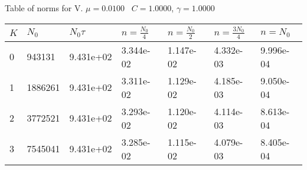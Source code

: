 \begin{center}
Table of norms for V. $\mu = 0.0100$ \, $C = 1.0000$, $\gamma = 1.0000$
  
\begin{tabular}{|p{0.8in}|p{0.8in}|p{0.8in}|p{0.8in}|p{0.8in}|p{0.8in}|p{0.8in}|} \hline
$K$ &$N_0$ &$N_0 \tau$ &$n = \frac{N_0}{4}$ &$n = \frac{N_0}{2}$ &$n = \frac{3N_0}{4}$ &$n = N_0$ \\ \hline 
0 &943131 &9.431e+02 &3.344e-02 &1.147e-02 &4.332e-03 &9.996e-04 \\ \hline 
1 &1886261 &9.431e+02 &3.311e-02 &1.129e-02 &4.185e-03 &9.050e-04 \\ \hline 
2 &3772521 &9.431e+02 &3.293e-02 &1.120e-02 &4.114e-03 &8.613e-04 \\ \hline 
3 &7545041 &9.431e+02 &3.285e-02 &1.115e-02 &4.079e-03 &8.405e-04 \\ \hline 

\end{tabular}\\[20pt]
\end{center}
